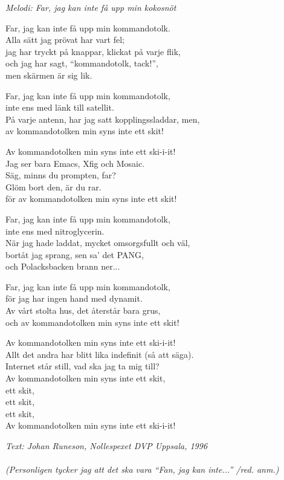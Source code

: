 {\footnotesize\textit{Melodi: Far, jag kan inte få upp min kokosnöt}}\par
\vspace{10pt}
Far, jag kan inte få upp min kommandotolk.\\
Alla sätt jag prövat har vart fel;\\
jag har tryckt på knappar, klickat på varje flik,\\
och jag har sagt, “kommandotolk, tack!”,\\
men skärmen är sig lik.\par
\vspace{10pt}
Far, jag kan inte få upp min kommandotolk,\\
inte ens med länk till satellit.\\
På varje antenn, har jag satt kopplingssladdar, men,\\
av kommandotolken min syns inte ett skit!\par
\vspace{10pt}
Av kommandotolken min syns inte ett ski-i-it!\\
Jag ser bara Emacs, Xfig och Mosaic.\\
Säg, minns du prompten, far?\\
Glöm bort den, är du rar.\\
för av kommandotolken min syns inte ett skit!\par
\vspace{10pt}
Far, jag kan inte få upp min kommandotolk,\\
inte ens med nitroglycerin.\\
När jag hade laddat, mycket omsorgsfullt och väl,\\
bortåt jag sprang, sen sa' det PANG,\\
och Polacksbacken brann ner...\par
\vspace{10pt}
Far, jag kan inte få upp min kommandotolk,\\
för jag har ingen hand med dynamit.\\
Av vårt stolta hus, det återstår bara grus,\\
och av kommandotolken min syns inte ett skit!\par
\vspace{10pt}
Av kommandotolken min syns inte ett ski-i-it!\\
Allt det andra har blitt lika indefinit (så att säga).\\
Internet står still, vad ska jag ta mig till?\\
Av kommandotolken min syns inte ett skit,\\
ett skit,\\
ett skit,\\
ett skit,\\
Av kommandotolken min syns inte ett ski-i-it!\par
\vspace{10pt}
{\footnotesize\textit{Text: Johan Runeson, Nollespexet DVP Uppsala,
    1996\\ \\ (Personligen tycker jag att det ska vara ``Fan, jag kan
    inte...'' /red. anm.)}}

